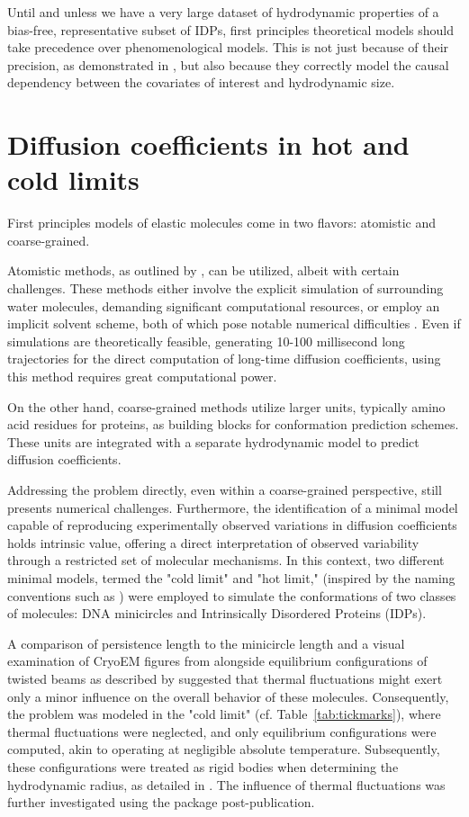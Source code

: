 \documentclass{doctoral}
\newcommand{\code}[1]{\texttt{\detokenize{#1}}}
\begin{document}
Until and unless we have a very large dataset of hydrodynamic properties of a bias-free, representative subset of IDPs, first principles theoretical models should take precedence over phenomenological models.
This is not just because of their precision, as demonstrated in \textcite{Waszkiewicz_2024_mda}, but also because they correctly model the causal dependency between the covariates of interest and hydrodynamic size.

\section{Diffusion coefficients in hot and cold limits}

First principles models of elastic molecules come in two flavors: atomistic and coarse-grained.

Atomistic methods, as outlined by \textcite{Karplus_1990}, can be utilized, albeit with certain challenges.
These methods either involve the explicit simulation of surrounding water molecules, demanding significant computational resources, or employ an implicit solvent scheme, both of which pose notable numerical difficulties \cite{Frenkel_2001}.
Even if simulations are theoretically feasible, generating 10-100 millisecond long trajectories for the direct computation of long-time diffusion coefficients, using this method requires great computational power.

On the other hand, coarse-grained methods utilize larger units, typically amino acid residues for proteins, as building blocks for conformation prediction schemes.
These units are integrated with a separate hydrodynamic model to predict diffusion coefficients.

Addressing the problem directly, even within a coarse-grained perspective, still presents numerical challenges.
Furthermore, the identification of a minimal model capable of reproducing experimentally observed variations in diffusion coefficients holds intrinsic value, offering a direct interpretation of observed variability through a restricted set of molecular mechanisms.
In this context, two different minimal models, termed the "cold limit" and "hot limit," (inspired by the naming conventions such as \cite{Murphy_2018,Bleibel_2014}) were employed to simulate the conformations of two classes of molecules: DNA minicircles and Intrinsically Disordered Proteins (IDPs).

A comparison of persistence length to the minicircle length and a visual examination of CryoEM figures from \textcite{Irobalieva_2015} alongside equilibrium configurations of twisted beams as described by \textcite{Coleman_2000} suggested that thermal fluctuations might exert only a minor influence on the overall behavior of these molecules.
Consequently, the problem was modeled in the "cold limit" (cf.
Table~\ref{tab:tickmarks}), where thermal fluctuations were neglected, and only equilibrium configurations were computed, akin to operating at negligible absolute temperature.
Subsequently, these configurations were treated as rigid bodies when determining the hydrodynamic radius, as detailed in \textcite{Waszkiewicz_2023_dna}.
The influence of thermal fluctuations was further investigated using the \code{pychastic} package post-publication.
\end{document}

